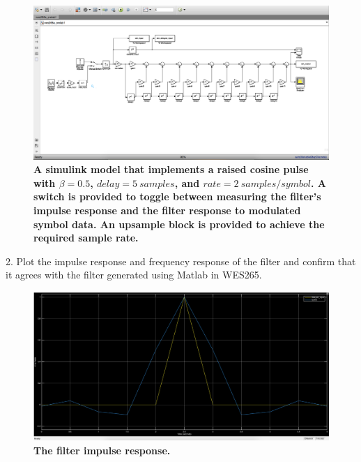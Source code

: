 \documentclass[letterpaper,12pt]{article}
\begin{document}
\begin{figure}[hbtp]
\includegraphics[width=1.0\columnwidth]{prelab1-simulation-diagram}
\caption{
\label{fig:prelab1-simulation-diagram}
{\bf A simulink model that implements a raised cosine pulse with $\beta=0.5$,
$delay = 5\ samples$, and $rate = 2\ samples/symbol$. A switch is provided to
toggle between measuring the filter's impulse response and the filter response
to modulated symbol data. An upsample block is provided to achieve the required
sample rate.
}
}
\end{figure}

2. Plot the impulse response and frequency response of the filter and confirm
that it agrees with the filter generated using Matlab in WES265. 

\begin{figure}[hbtp]
\includegraphics[width=1.0\columnwidth]{prelab1-filter-impulse-response}
\caption{
\label{fig:prelab1-filter-impulse-response}
{\bf The filter impulse response.
}
}
\end{figure}
\end{document}
